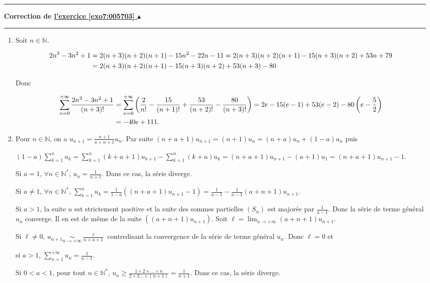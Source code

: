 \documentclass[11pt,a4paper]{article}
\newcommand{\Nn}{\mathbb{N}} \newcommand{\N}{\mathbb{N}}
\newcounter{exo}
\newcommand{\correction}[1]{\hypertarget{cor7:#1}{}\label{cor7:#1}{\bf Correction de \hyperlink{exo7:#1}{l'exercice \ref{exo7:#1} $\blacktriangle$}}\vspace{1mm}\hrule\vspace{1mm}}
\newcommand{\fincorrection}{\vspace{1mm}\hrule\vspace*{7mm}}
\begin{document}
\fincorrection
\correction{005703}
\begin{enumerate}
 \item  Soit $n\in\Nn$.

\begin{align*}\ensuremath
2n^3-3n^2+1&=2(n+3)(n+2)(n+1)-15n^2 - 22n -11= 2(n+3)(n+2)(n+1)-15(n+3)(n+2) +53n+79\\
 &= 2(n+3)(n+2)(n+1)-15(n+3)(n+2)+53(n+3)-80
\end{align*}

Donc

\begin{align*}\ensuremath
\sum_{n=0}^{+\infty}\frac{2n^3-3n^2+1}{(n+3)!}&=\sum_{n=0}^{+\infty}\left(\frac{2}{n!}-\frac{15}{(n+1)!}+\frac{53}{(n+2)!}-\frac{80}{(n+3)!}\right)=2e-15(e-1)+53(e-2)-80\left(e-\frac{5}{2}\right)\\
 &=-40e + 111.
\end{align*}

\begin{center}
\end{center}

\item  Pour $n\in\Nn$, on a $u_{n+1}=\frac{n+1}{a+n+1}u_n$. Par suite $(n+a+1)u_{n+1}= (n+1)u_n = (n+a)u_n + (1-a)u_n$ puis

\begin{center}
$(1-a)\sum_{k=1}^{n}u_k=\sum_{k=1}^{n}(k+a+1)u_{k+1}-\sum_{k=1}^{n}(k+a)u_k =(n+a+1)u_{n+1}-(a+1)u_1 =(n+a+1)u_{n+1}-1.$
\end{center}

Si $a = 1$, $\forall n\in\Nn^*$, $u_n=\frac{1}{n+1}$. Dans ce cas, la série diverge.

Si $a\neq 1$, $\forall n\in\Nn^*$, $\sum_{k=1}^{n}u_k=\frac{1}{1-a}((n+a+1)u_{n+1} - 1)=\frac{1}{a-1}- \frac{1}{a-1}(a+n+1)u_{n+1}$.

Si $a > 1$, la suite $u$ est strictement positive et la suite des sommes partielles $(S_n)$ est majorée par $\frac{1}{a-1}$. Donc la série de terme général $u_n$ converge. Il en est de même de la suite $((a+n+1)u_{n+1})$. Soit $\ell=\lim_{n \rightarrow +\infty}(a+n+1)u_{n+1}$.

Si $\ell\neq0$, $u_{n+1}\underset{n\rightarrow+\infty}{\sim}\frac{\ell}{n+a+1}$ contredisant la convergence de la série de terme général $u_n$. Donc $\ell= 0$ et

\begin{center}
si $a > 1$,  $\sum_{n=1}^{+\infty}u_n=\frac{1}{a-1}$.
\end{center}

Si $0<a<1$, pour tout $n\in\Nn^*$, $u_n\geqslant\frac{1\times2\times\ldots\times n}{2\times3\ldots\times(n+1)}=\frac{1}{n+1}$. Dans ce cas, la série diverge.
\end{enumerate}
\end{document}
